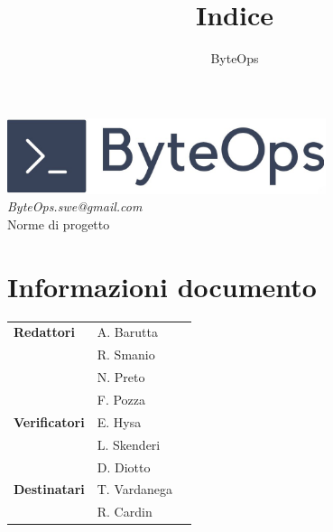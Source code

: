 \documentclass{article}
\title{\textbf{\fontsize{28}{6}\selectfont Indice}}
\author{\fontsize{14}{6}\selectfont ByteOps}
\date{}
\begin{document}
\pagestyle{fancy}
\begin{center}
    \includegraphics[width = 0.7\textwidth]{../Images/logo.png} \\
    \vspace{0.2cm}
    \textcolor[RGB]{60, 60, 60}{\textit{ByteOps.swe@gmail.com}} \\
    \vspace{2cm}
    \fontsize{16}{6}\selectfont Norme di progetto \\
    \vspace{0.5cm}
\end{center}

\section*{Informazioni documento}
\def\arraystretch{1.2}
\begin{tabular}{>{\raggedleft\arraybackslash}p{}|>{\raggedright\arraybackslash}p{}c}
    \hline
    \addlinespace
    \textbf{Redattori}      & A. Barutta             \\ & R. Smanio \\ & N. Preto \\ & F. Pozza \vspace{10pt} \\
    \textbf{Verificatori}   & E. Hysa                \\ & L. Skenderi \\ & D. Diotto \vspace{10pt} \\
    \textbf{Destinatari}    & T. Vardanega           \\ & R. Cardin \vspace{10pt} \\
\end{tabular}
\pagebreak

\end{document}

